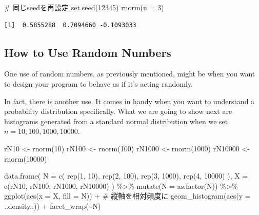 \documentclass[
  a4paper,
]{book}
\newenvironment{Shaded}{\begin{snugshade}}{\end{snugshade}}
\newcommand{\AttributeTok}[1]{\textcolor[rgb]{0.40,0.45,0.13}{#1}}
\newcommand{\CommentTok}[1]{\textcolor[rgb]{0.37,0.37,0.37}{#1}}
\newcommand{\DecValTok}[1]{\textcolor[rgb]{0.68,0.00,0.00}{#1}}
\newcommand{\FunctionTok}[1]{\textcolor[rgb]{0.28,0.35,0.67}{#1}}
\newcommand{\NormalTok}[1]{\textcolor[rgb]{0.00,0.23,0.31}{#1}}
\newcommand{\OtherTok}[1]{\textcolor[rgb]{0.00,0.23,0.31}{#1}}
\newcommand{\SpecialCharTok}[1]{\textcolor[rgb]{0.37,0.37,0.37}{#1}}
\begin{document}
\begin{Shaded}
\begin{Highlighting}[]
\CommentTok{\# 同じseedを再設定}
\FunctionTok{set.seed}\NormalTok{(}\DecValTok{12345}\NormalTok{)}
\FunctionTok{rnorm}\NormalTok{(}\AttributeTok{n =} \DecValTok{3}\NormalTok{)}
\end{Highlighting}
\end{Shaded}

\begin{verbatim}
[1]  0.5855288  0.7094660 -0.1093033
\end{verbatim}

\subsection{How to Use Random Numbers}\label{how-to-use-random-numbers}

One use of random numbers, as previously mentioned, might be when you
want to design your program to behave as if it's acting randomly.

In fact, there is another use. It comes in handy when you want to
understand a probability distribution specifically. What we are going to
show next are histograms generated from a standard normal distribution
when we set \(n = 10,100,1000,10000\).

\begin{Shaded}
\begin{Highlighting}[]
\NormalTok{rN10 }\OtherTok{\textless{}{-}} \FunctionTok{rnorm}\NormalTok{(}\DecValTok{10}\NormalTok{)}
\NormalTok{rN100 }\OtherTok{\textless{}{-}} \FunctionTok{rnorm}\NormalTok{(}\DecValTok{100}\NormalTok{)}
\NormalTok{rN1000 }\OtherTok{\textless{}{-}} \FunctionTok{rnorm}\NormalTok{(}\DecValTok{1000}\NormalTok{)}
\NormalTok{rN10000 }\OtherTok{\textless{}{-}} \FunctionTok{rnorm}\NormalTok{(}\DecValTok{10000}\NormalTok{)}

\FunctionTok{data.frame}\NormalTok{(}
  \AttributeTok{N =} \FunctionTok{c}\NormalTok{(}
    \FunctionTok{rep}\NormalTok{(}\DecValTok{1}\NormalTok{, }\DecValTok{10}\NormalTok{), }\FunctionTok{rep}\NormalTok{(}\DecValTok{2}\NormalTok{, }\DecValTok{100}\NormalTok{),}
    \FunctionTok{rep}\NormalTok{(}\DecValTok{3}\NormalTok{, }\DecValTok{1000}\NormalTok{), }\FunctionTok{rep}\NormalTok{(}\DecValTok{4}\NormalTok{, }\DecValTok{10000}\NormalTok{)}
\NormalTok{  ),}
  \AttributeTok{X =} \FunctionTok{c}\NormalTok{(rN10, rN100, rN1000, rN10000)}
\NormalTok{) }\SpecialCharTok{\%\textgreater{}\%}
  \FunctionTok{mutate}\NormalTok{(}\AttributeTok{N =} \FunctionTok{as.factor}\NormalTok{(N)) }\SpecialCharTok{\%\textgreater{}\%}
  \FunctionTok{ggplot}\NormalTok{(}\FunctionTok{aes}\NormalTok{(}\AttributeTok{x =}\NormalTok{ X, }\AttributeTok{fill =}\NormalTok{ N)) }\SpecialCharTok{+}
  \CommentTok{\# 縦軸を相対頻度に}
  \FunctionTok{geom\_histogram}\NormalTok{(}\FunctionTok{aes}\NormalTok{(}\AttributeTok{y =}\NormalTok{ ..density..)) }\SpecialCharTok{+}
  \FunctionTok{facet\_wrap}\NormalTok{(}\SpecialCharTok{\textasciitilde{}}\NormalTok{N)}
\end{Highlighting}
\end{Shaded}
\end{document}
